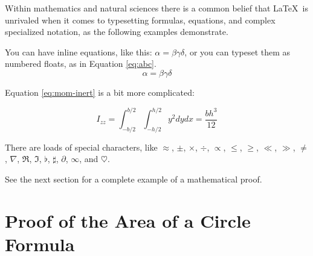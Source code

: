 \begin{table}[!htbp]
\centering
{}
\caption{Complex table}
\label{tab:complex}
\end{table}

Within mathematics and natural sciences there is a common belief that \LaTeX\ is unrivaled when it comes to typesetting formulas, equations, and complex specialized notation, as the following examples demonstrate.

You can have inline equations, like this: $ \alpha = \beta \gamma \delta $, or you can typeset them as numbered floats, as in Equation \ref{eq:abc}.
\begin{equation}
  \alpha = \beta \gamma \delta
  \label{eq:abc}
\end{equation}

Equation \ref{eq:mom-inert} is a bit more complicated:

\begin{equation}
  I_{zz} = \int_{-b/2}^{b/2} \int_{-h/2}^{h/2} y^2 dy dx = \frac{b h^3}{12}
  \label{eq:mom-inert}
\end{equation}

There are loads of special characters, like $\approx$, $\pm$,
$\times$, $\div$, $\propto$, $\leq$, $\geq$, $\ll$, $\gg$, $\neq$,
$\nabla$, $\Re$, $\Im$, $\flat$, $\sharp$, $\partial$, $\infty$, and $\heartsuit$.


See the next section for a complete example of a mathematical proof.

\section{Proof of the Area of a Circle Formula}

